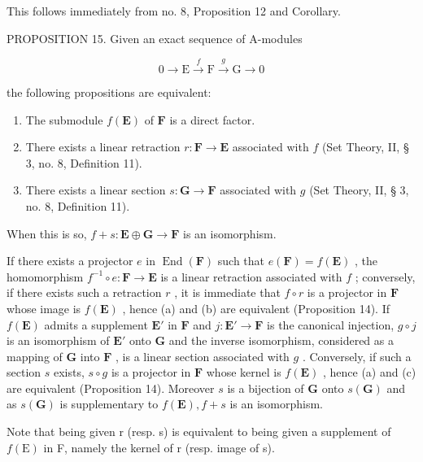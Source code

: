 This follows immediately from no. 8, Proposition 12 and Corollary.

PROPOSITION 15. Given an exact sequence of A-modules

\[
0 \longrightarrow \mathrm{E} \stackrel {f} {\longrightarrow} \mathrm{F} \stackrel {g} {\longrightarrow} \mathrm{G} \longrightarrow 0\tag{33}
\]

the following propositions are equivalent:

\begin{enumerate}
\def\labelenumi{(\alph{enumi})}
\item
  The submodule \(f(\mathbf{E})\) of \(\mathbf{F}\) is a direct factor.
\item
  There exists a linear retraction \(r: \mathbf{F} \to \mathbf{E}\) associated with \(f\) (Set Theory, II, § 3, no. 8, Definition 11).
\item
  There exists a linear section \(s: \mathbf{G} \to \mathbf{F}\) associated with \(g\) (Set Theory, II, § 3, no. 8, Definition 11).
\end{enumerate}

When this is so, \(f + s: \mathbf{E} \oplus \mathbf{G} \to \mathbf{F}\) is an isomorphism.

If there exists a projector \(e\) in \(\operatorname{End}(\mathbf{F})\) such that \(e(\mathbf{F}) = f(\mathbf{E})\) , the homomorphism \(f^{-1} \circ e: \mathbf{F} \to \mathbf{E}\) is a linear retraction associated with \(f\) ; conversely, if there exists such a retraction \(r\) , it is immediate that \(f \circ r\) is a projector in \(\mathbf{F}\) whose image is \(f(\mathbf{E})\) , hence (a) and (b) are equivalent (Proposition 14). If \(f(\mathbf{E})\) admits a supplement \(\mathbf{E}'\) in \(\mathbf{F}\) and \(j: \mathbf{E}' \to \mathbf{F}\) is the canonical injection, \(g \circ j\) is an isomorphism of \(\mathbf{E}'\) onto \(\mathbf{G}\) and the inverse isomorphism, considered as a mapping of \(\mathbf{G}\) into \(\mathbf{F}\) , is a linear section associated with \(g\) . Conversely, if such a section \(s\) exists, \(s \circ g\) is a projector in \(\mathbf{F}\) whose kernel is \(f(\mathbf{E})\) , hence (a) and (c) are equivalent (Proposition 14). Moreover \(s\) is a bijection of \(\mathbf{G}\) onto \(s(\mathbf{G})\) and as \(s(\mathbf{G})\) is supplementary to \(f(\mathbf{E}), f + s\) is an isomorphism.

Note that being given r (resp. s) is equivalent to being given a supplement of \(f(\mathrm{E})\) in F, namely the kernel of r (resp. image of s).

